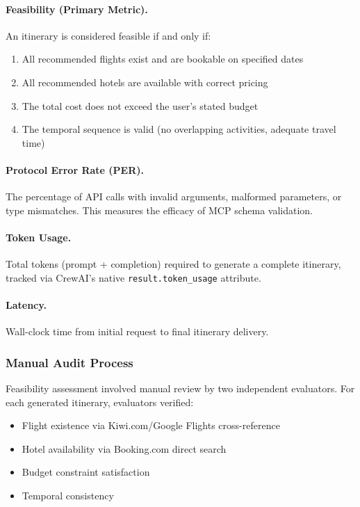 \documentclass[preprint,review,12pt]{elsarticle}
\begin{document}
\paragraph{Feasibility (Primary Metric).} An itinerary is considered feasible if and only if:
\begin{enumerate}
    \item All recommended flights exist and are bookable on specified dates
    \item All recommended hotels are available with correct pricing
    \item The total cost does not exceed the user's stated budget
    \item The temporal sequence is valid (no overlapping activities, adequate travel time)
\end{enumerate}

\paragraph{Protocol Error Rate (PER).} The percentage of API calls with invalid arguments, malformed parameters, or type mismatches. This measures the efficacy of MCP schema validation.

\paragraph{Token Usage.} Total tokens (prompt + completion) required to generate a complete itinerary, tracked via CrewAI's native \texttt{result.token\_usage} attribute.

\paragraph{Latency.} Wall-clock time from initial request to final itinerary delivery.

\subsubsection{Manual Audit Process}

Feasibility assessment involved manual review by two independent evaluators. For each generated itinerary, evaluators verified:
\begin{itemize}
    \item Flight existence via Kiwi.com/Google Flights cross-reference
    \item Hotel availability via Booking.com direct search
    \item Budget constraint satisfaction
    \item Temporal consistency
\end{itemize}
\end{document}
